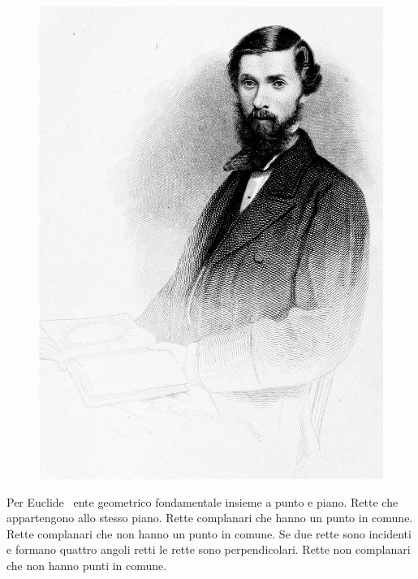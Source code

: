 \begin{figure}
	\centering{}
	\label{fig:frontispiecetomemoirofthelatealexanderhenryrhindofsibster}
	\includegraphics[width=0.7\linewidth]{Figure/R/Frontispiece_to_Memoir_of_the_late_Alexander_Henry_Rhind,_of_Sibster}
\end{figure}
Per Euclide\pointsto~ ente geometrico fondamentale insieme a punto e piano.
Rette che appartengono allo stesso piano.
Rette complanari che hanno un punto in comune.
Rette complanari che non hanno un punto in comune.
Se due rette sono incidenti e formano quattro angoli retti le rette sono perpendicolari.
Rette non complanari che non hanno punti in comune.